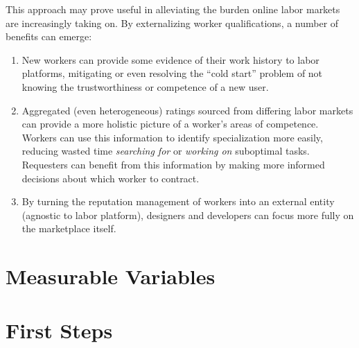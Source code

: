 \documentclass[11pt]{article}
\begin{document}
This approach may prove useful in
alleviating the burden online labor markets are increasingly taking on.
By externalizing worker qualifications, a number of benefits can emerge:
\begin{enumerate}
  \item New workers can provide some evidence of their work history to labor platforms,
        mitigating or even resolving the ``cold start'' problem of
        not knowing the trustworthiness or competence of a new user.
  \item Aggregated (even heterogeneous)
        ratings sourced from differing labor markets can provide
        a more holistic picture of a worker's areas of competence.
        Workers can use this information to identify specialization more easily,
        reducing wasted time \textit{searching for} or \textit{working on} suboptimal tasks.
        Requesters can benefit from this information by
        making more informed decisions about which worker to contract.
  \item By turning the reputation management of workers into an external entity
        (agnostic to labor platform),
        designers and developers can focus more fully on the marketplace itself.
\end{enumerate}


\section*{Measurable Variables}


\section*{First Steps}

\end{document}
